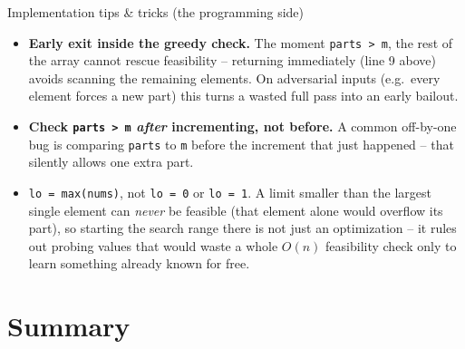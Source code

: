 \documentclass[11pt,aspectratio=169]{beamer}
\begin{document}
\begin{frame}{Implementation tips \& tricks (the programming side)}
  \small
  \begin{itemize}
    \item \textbf{Early exit inside the greedy check.} The moment \texttt{parts > m}, the
    rest of the array cannot rescue feasibility -- returning immediately (line 9 above)
    avoids scanning the remaining elements. On adversarial inputs (e.g.\ every element
    forces a new part) this turns a wasted full pass into an early bailout.
    \item \textbf{Check \texttt{parts > m} \emph{after} incrementing, not before.} A
    common off-by-one bug is comparing \texttt{parts} to \texttt{m} before the increment
    that just happened -- that silently allows one extra part.
    \item \texttt{lo = max(nums)}, not \texttt{lo = 0} or \texttt{lo = 1}. A limit smaller
    than the largest single element can \emph{never} be feasible (that element alone
    would overflow its part), so starting the search range there is not just an
    optimization -- it rules out probing values that would waste a whole $O(n)$ feasibility
    check only to learn something already known for free.
  \end{itemize}
\end{frame}

\section{Summary}
\end{document}
